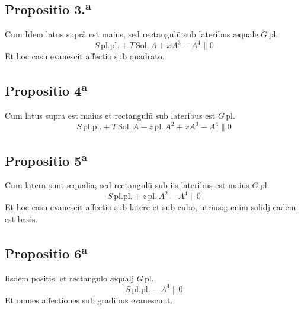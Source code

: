 \documentclass[11pt,a4paper]{article}
\begin{document}
\subsection*{Propositio 3.\textsuperscript{a}}

Cum Idem latus suprà est maius, sed rectangulū sub lateribus æquale $G\,\mathrm{pl.}$
\[ S\,\mathrm{pl.pl.} + T\,\mathrm{Sol.}\,A + xA^{3} - A^{4} \parallel 0 \]
Et hoc casu evanescit affectio sub quadrato.

\subsection*{Propositio 4\textsuperscript{a}}

Cum latus supra est maius et rectangulū sub lateribus est  $G\,\mathrm{pl.}$
\[ S\,\mathrm{pl.pl.} + T\,\mathrm{Sol.}\,A - z\,\mathrm{pl.}\,A^{2} + xA^{3} - A^{4} \parallel 0 \]

\subsection*{Propositio 5\textsuperscript{a}}

Cum latera sunt æqualia, sed rectangulū sub iis lateribus est maius $G\,\mathrm{pl.}$
\[ S\,\mathrm{pl.pl.} + z\,\mathrm{pl.}\,A^{2} - A^{4} \parallel 0 \]
Et hoc casu evanescit affectio sub latere et sub cubo, utriusq; enim solidj eadem est basis.

\subsection*{Propositio 6\textsuperscript{a}}

Iisdem positis, et rectangulo æqualj $G\,\mathrm{pl.}$
\[ S\,\mathrm{pl.pl.} - A^{4} \parallel 0 \]
Et omnes affectiones sub gradibus evanescunt.

\end{document}
